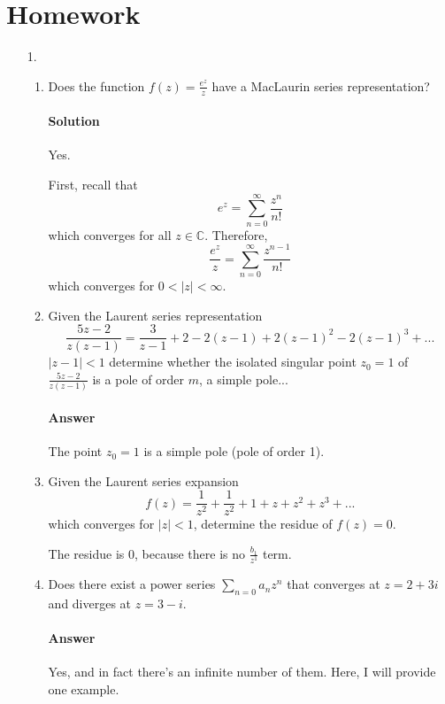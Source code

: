 \documentclass[11pt]{article}
\begin{document}
\section{Homework}
\begin{enumerate}
	\item[1.] 
		\begin{enumerate}
			\item Does the function $f(z) = \frac{e^z}{z}$ have a MacLaurin series representation?
			
			\paragraph{Solution} Yes.
			
			First, recall that
			\[e^z = \sum^{\infty}_{n=0} \frac{z^n}{n!} \]
			which converges for all $z \in \mathbb{C}$. Therefore,
			\[\frac{e^z}{z} = \sum^{\infty}_{n=0} \frac{z^{n - 1}}{n!} \]
			which converges for $0 < |z| < \infty$.
			
			\item Given the Laurent series representation
			\[
			\frac{5z - 2}{z(z - 1)} = \frac{3}{z - 1} + 2 - 2(z - 1) +
			2(z - 1)^2 - 2(z - 1)^3 + ...
			\]
			$|z - 1| < 1$ determine whether the isolated singular point $z_0 = 1$ of 
			$\frac{5z - 2}{z(z - 1)}$ is a pole of order $m$, a simple pole...
			
			\paragraph{Answer} The point $z_0 = 1$ is a simple pole (pole of order 1).
			
			\item Given the Laurent series expansion
			\[f(z) = \frac{1}{z^2} + \frac{1}{z^2} + 1 + z + z^2 + z^3 + ...\]
			which converges for $|z| < 1$, determine the residue of $f(z) = 0$.
			
			The residue is 0, because there is no $\frac{b_1}{z^1}$ term.
			
			\item Does there exist a power series $\sum_{n = 0} a_n z^n$ that converges at $z = 2 + 3i$ and diverges at $z = 3 - i$.
			
			\paragraph{Answer} Yes, and in fact there's an infinite number of them. Here, I will provide one example.
			

\end{enumerate}
\end{enumerate}
\end{document}
